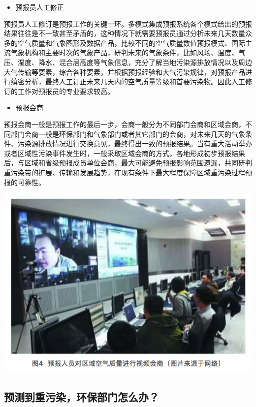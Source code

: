 \documentclass[]{book}
\providecommand{\tightlist}{%
  \setlength{\itemsep}{0pt}\setlength{\parskip}{0pt}}
\begin{document}
\begin{itemize}
\tightlist
\item
  预报员人工修正
\end{itemize}

预报员人工修订是预报工作的关键一环。多模式集成预报系统各个模式给出的预报结果往往是不一致甚至矛盾的，这种情况下就需要预报员通过分析未来几天数量众多的空气质量和气象图形及数据产品，比较不同的空气质量数值预报模式、国际主流气象机构和主要时次的气象产品，研判未来的气象条件，比如风场、温度、气压、湿度、降水、混合层高度等气象信息，充分了解当地污染源排放情况以及周边大气传输等要素，综合各种要素，并根据预报经验和大气污染规律，对预报产品进行缜密分析，最终人工订正未来几天内的空气质量等级和首要污染物。因此人工修订的工作对预报员的专业要求较高。

\begin{itemize}
\tightlist
\item
  预报会商
\end{itemize}

预报会商一般是预报工作的最后一步，会商一般分为不同部门会商和区域会商，不同部门会商一般是环保部门和气象部门或者其它部门的会商，对未来几天的气象条件、污染源排放情况进行交换意见，最终得出一致的预报结果。当有重大活动举办或者区域性污染事件发生时，一般采取区域会商的方式，各地形成初步预报结果后，与区域和省级预报成员单位会商，最大可能避免预报影响范围遗漏，共同研判重污染带的扩展、传输和发展趋势，在现有条件下最大程度保障区域重污染过程预报的可靠性。

\includegraphics[width=8.33in]{images/kqyb4}

\subsection{预测到重污染，环保部门怎么办？}
\end{document}
